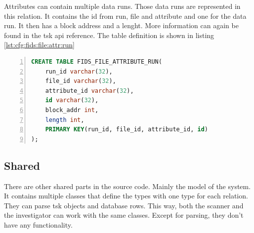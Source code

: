 Attributes can contain multiple data runs. Those data runs are represented in this relation. It contains the \gls{id} from run, file and attribute and one for the data run. It then has a block address and a lenght. More information can again be found in the \gls{tsk} \gls{api} reference. \cite{tsk:attr:run:struct} The table definition is shown in listing \ref{lst:cfg:fids:file:attr:run}

\begin{lstlisting}[language=sql, numbers=left, caption=Fids File Attribute Run Table Definition, label=lst:cfg:fids:file:attr:run]
CREATE TABLE FIDS_FILE_ATTRIBUTE_RUN(
	run_id varchar(32),
	file_id varchar(32),
	attribute_id varchar(32), 
	id varchar(32), 
	block_addr int, 
	length int, 
	PRIMARY KEY(run_id, file_id, attribute_id, id) 
);
\end{lstlisting}

\subsection{Shared}

There are other shared parts in the source code. Mainly the model of the system. It contains multiple classes that define the types with one type for each relation. They can parse \gls{tsk} objects and database rows. This way, both the scanner and the investigator can work with the same classes. Except for parsing, they don't have any functionality.
